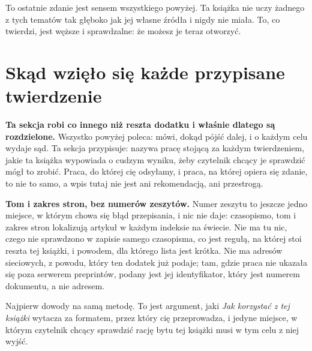 \medskip
To ostatnie zdanie jest sensem wszystkiego powyżej. Ta książka nie uczy żadnego
z tych tematów tak głęboko jak jej własne źródła i nigdy nie miała. To, co
twierdzi, jest węższe i sprawdzalne: że możesz je teraz otworzyć.

\section{Skąd wzięło się każde przypisane twierdzenie}
\label{sec:E-sources}

\textbf{Ta sekcja robi co innego niż reszta dodatku i właśnie dlatego są
rozdzielone.} Wszystko powyżej poleca: mówi, dokąd pójść dalej, i o każdym celu
wydaje sąd. Ta sekcja przypisuje: nazywa pracę stojącą za każdym twierdzeniem,
jakie ta książka wypowiada o cudzym wyniku, żeby czytelnik chcący je sprawdzić
mógł to zrobić. Praca, do której cię odsyłamy, i praca, na której opiera się
zdanie, to nie to samo, a wpis tutaj nie jest ani rekomendacją, ani
przestrogą.

\begin{note}
\textbf{Tom i zakres stron, bez numerów zeszytów.} Numer zeszytu to jeszcze
jedno miejsce, w którym chowa się błąd przepisania, i nic nie daje: czasopismo,
tom i zakres stron lokalizują artykuł w każdym indeksie na świecie. Nie ma tu nic, czego nie sprawdzono w
zapisie samego czasopisma, co jest regułą, na której stoi reszta tej książki, i
powodem, dla którego lista jest krótka. Nie ma adresów sieciowych, z powodu,
który ten dodatek już podaje; tam, gdzie praca nie ukazała się poza serwerem
preprintów, podany jest jej identyfikator, który jest numerem dokumentu, a nie
adresem.
\end{note}

\medskip
Najpierw dowody na samą metodę. To jest argument, jaki \emph{Jak korzystać z
tej książki} wytacza za formatem, przez który cię przeprowadza, i jedyne
miejsce, w którym czytelnik chcący sprawdzić rację bytu tej książki musi w tym
celu z niej wyjść.


